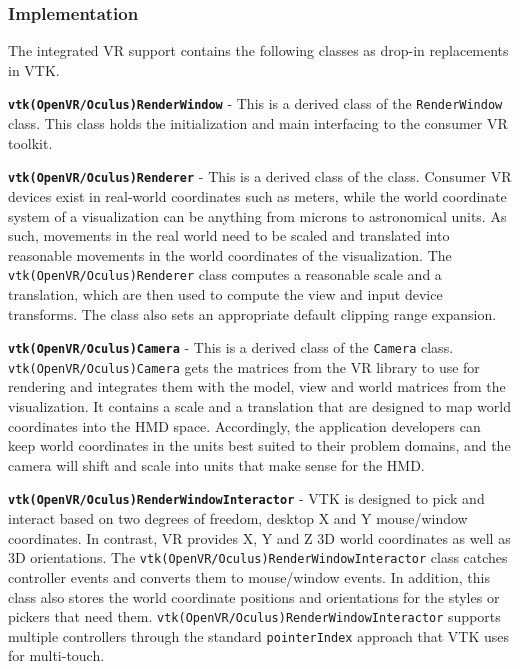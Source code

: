 \subsubsection{Implementation}

The integrated VR support contains the following classes as drop-in replacements in VTK.

\textbf{\texttt{vtk(OpenVR/Oculus)RenderWindow}} - This is a derived class of the \texttt{RenderWindow} class.
This class holds the initialization and main interfacing to the consumer VR toolkit. 

\textbf{\texttt{vtk(OpenVR/Oculus)Renderer}} - This is a derived class of the  class.
Consumer VR devices exist in real-world coordinates such as meters, while the world coordinate system of a visualization can be anything from microns to astronomical units. As such, movements in the real world need to be scaled and translated into reasonable movements in the world coordinates of the visualization. The \texttt{vtk(OpenVR/Oculus)Renderer} class computes a reasonable scale and a translation, which are then used to compute the view and input device transforms. 
The class also sets an appropriate default clipping range expansion.

\textbf{\texttt{vtk(OpenVR/Oculus)Camera}} - This is a derived class of the \texttt{Camera} class. \texttt{vtk(OpenVR/Oculus)Camera} gets the matrices from the VR library to use for rendering and integrates them with the model, view and world matrices from the visualization. It contains a scale and a translation that are designed to map world coordinates into the HMD space.
Accordingly, the application developers can keep world coordinates in the units best suited to their problem domains, and the camera will shift and scale into units that make sense for the HMD.

\textbf{\texttt{vtk(OpenVR/Oculus)RenderWindowInteractor}} - VTK is designed to pick and interact based on two degrees of freedom, desktop X and Y mouse/window coordinates.
In contrast, VR provides X, Y and Z 3D world coordinates as well as 3D orientations.
The \texttt{vtk(OpenVR/Oculus)RenderWindowInteractor} class catches controller events and converts them to mouse/window events.
In addition, this class also stores the world coordinate positions and orientations for the styles or pickers that need them.
\texttt{vtk(OpenVR/Oculus)RenderWindowInteractor} supports multiple controllers through the standard \texttt{pointerIndex} approach that VTK uses for multi-touch.

